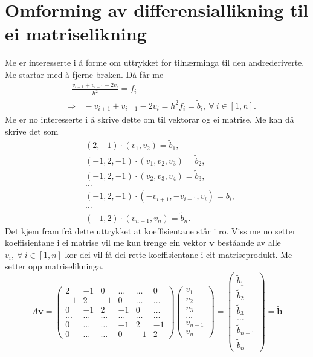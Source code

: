 \documentclass[11pt, a4paper]{article}
\begin{document}
\section{Omforming av differensiallikning til ei matriselikning}
  Me er interesserte i å forme om uttrykket for tilnærminga til den andrederiverte. Me startar med å 
  fjerne brøken. Då får me
  \begin{align*}
    &-\frac{v_{i+1} + v_{i-1} - 2v_i}{h^2} = f_i \\ 
    &\Rightarrow \ \ \ -v_{i+1} + v_{i-1} - 2v_i = h^2f_i = \tilde{b}_i, \ \forall \ i \in [1, n].
  \end{align*}
  Me er no interesserte i å skrive dette om til vektorar og ei matrise. Me kan då skrive det som
  \begin{align*}
    &(2, -1)\cdot(v_1, v_2) = \tilde{b}_1, \\
    &(-1, 2, -1)\cdot(v_1, v_2, v_3) = \tilde{b}_2, \\
    &(-1, 2, -1)\cdot(v_2, v_3, v_4) = \tilde{b}_3, \\
    &\dots \\
    &(-1, 2, -1)\cdot(-v_{i+1}, -v_{i-1}, v_i) = \tilde{b}_i, \\
    &\dots \\
    &(-1, 2)\cdot(v_{n-1}, v_{n}) = \tilde{b}_n.
  \end{align*}
  Det kjem fram frå dette uttrykket at koeffisientane står i ro. Viss me no setter koeffisientane i ei
  matrise vil me kun trenge ein vektor $\mathbf{v}$ beståande av alle $v_i, \ \forall \ i \in [1, n]$
  kor dei vil få dei rette koeffisientane i eit matriseprodukt. Me setter opp matriselikninga.
  \begin{equation*}
    A\mathbf{v} = 
    \begin{pmatrix}
      2 & -1 & 0 & \dots & \dots & 0 \\
      -1 & 2 & -1 & 0 & \dots & \dots \\
      0 & -1 & 2 & -1 & 0 & \dots \\
      \dots & \dots & \dots & \dots & \dots & \dots \\
      0 & \dots & \dots & -1 & 2 & -1 \\
      0 & \dots & \dots & 0 & -1 & 2
    \end{pmatrix}
    \begin{pmatrix}
      v_1 \\
      v_2 \\
      v_3 \\
      \dots \\
      v_{n-1} \\
      v_{n}
    \end{pmatrix} = 
    \begin{pmatrix}
      \tilde{b}_1 \\
      \tilde{b}_2 \\
      \tilde{b}_3 \\       
      \dots \\
      \tilde{b}_{n-1} \\
      \tilde{b}_n
    \end{pmatrix} = \mathbf{\tilde{b}}
  \end{equation*}
\end{document}
